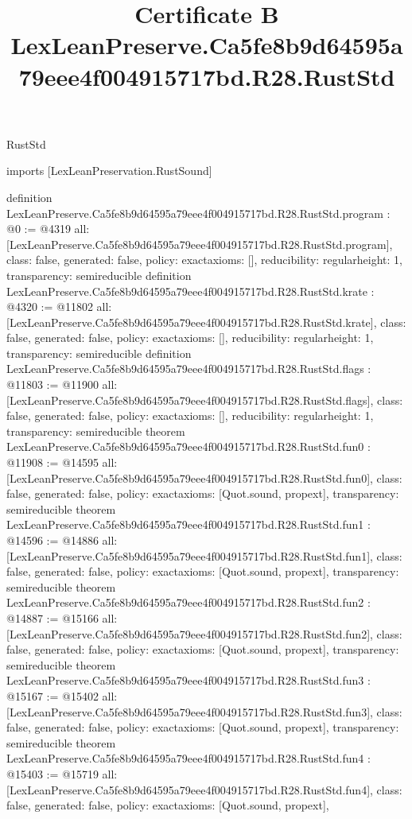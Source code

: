 \begin{lexlean}{RustStd}
\title{Certificate B LexLeanPreserve.Ca5fe8b9d64595a79eee4f004915717bd.R28.RustStd}
\begin{coremodule}
imports [LexLeanPreservation.RustSound]

definition LexLeanPreserve.Ca5fe8b9d64595a79eee4f004915717bd.R28.RustStd.program : @0 := @4319 {
  all: [LexLeanPreserve.Ca5fe8b9d64595a79eee4f004915717bd.R28.RustStd.program],
  class: false,
  generated: false,
  policy: exact{axioms: []},
  reducibility: regular{height: 1},
  transparency: semireducible
}
definition LexLeanPreserve.Ca5fe8b9d64595a79eee4f004915717bd.R28.RustStd.krate : @4320 := @11802 {
  all: [LexLeanPreserve.Ca5fe8b9d64595a79eee4f004915717bd.R28.RustStd.krate],
  class: false,
  generated: false,
  policy: exact{axioms: []},
  reducibility: regular{height: 1},
  transparency: semireducible
}
definition LexLeanPreserve.Ca5fe8b9d64595a79eee4f004915717bd.R28.RustStd.flags : @11803 := @11900 {
  all: [LexLeanPreserve.Ca5fe8b9d64595a79eee4f004915717bd.R28.RustStd.flags],
  class: false,
  generated: false,
  policy: exact{axioms: []},
  reducibility: regular{height: 1},
  transparency: semireducible
}
theorem LexLeanPreserve.Ca5fe8b9d64595a79eee4f004915717bd.R28.RustStd.fun0 : @11908 := @14595 {
  all: [LexLeanPreserve.Ca5fe8b9d64595a79eee4f004915717bd.R28.RustStd.fun0],
  class: false,
  generated: false,
  policy: exact{axioms: [Quot.sound, propext]},
  transparency: semireducible
}
theorem LexLeanPreserve.Ca5fe8b9d64595a79eee4f004915717bd.R28.RustStd.fun1 : @14596 := @14886 {
  all: [LexLeanPreserve.Ca5fe8b9d64595a79eee4f004915717bd.R28.RustStd.fun1],
  class: false,
  generated: false,
  policy: exact{axioms: [Quot.sound, propext]},
  transparency: semireducible
}
theorem LexLeanPreserve.Ca5fe8b9d64595a79eee4f004915717bd.R28.RustStd.fun2 : @14887 := @15166 {
  all: [LexLeanPreserve.Ca5fe8b9d64595a79eee4f004915717bd.R28.RustStd.fun2],
  class: false,
  generated: false,
  policy: exact{axioms: [Quot.sound, propext]},
  transparency: semireducible
}
theorem LexLeanPreserve.Ca5fe8b9d64595a79eee4f004915717bd.R28.RustStd.fun3 : @15167 := @15402 {
  all: [LexLeanPreserve.Ca5fe8b9d64595a79eee4f004915717bd.R28.RustStd.fun3],
  class: false,
  generated: false,
  policy: exact{axioms: [Quot.sound, propext]},
  transparency: semireducible
}
theorem LexLeanPreserve.Ca5fe8b9d64595a79eee4f004915717bd.R28.RustStd.fun4 : @15403 := @15719 {
  all: [LexLeanPreserve.Ca5fe8b9d64595a79eee4f004915717bd.R28.RustStd.fun4],
  class: false,
  generated: false,
  policy: exact{axioms: [Quot.sound, propext]},
}
\end{coremodule}
\end{lexlean}
